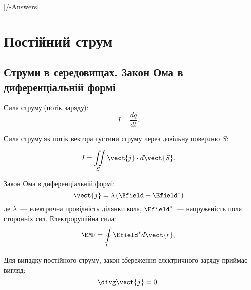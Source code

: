 
[\currfilebase/\currfilebase-Answers]
\chapter{Постійний струм}\label{\currfilebase}

\section{Струми в середовищах. Закон Ома в диференціальній формі}

\begin{Theory}



  Сила струму (потік заряду):
	\begin{equation} 
		I = \frac{dq}{dt}.
	\end{equation}
 
  Сила струму як потік вектора густини струму через довільну поверхню $S$:

  \begin{equation} 
	  I = \iint\limits_S\vect{j}\cdot d\vect{S}.
  \end{equation}



	Закон Ома в диференціальній формі:
  \begin{equation} 
	  \vect{j} = \lambda\left( \Efield + \Efield^*\right)
  \end{equation}
	\noindent де $\lambda$~--- електрична провідність ділянки кола,  $\Efield^*$~--- напруженість поля сторонніх сил. 
	Електрорушійна сила:
	\begin{equation} 
	\EMF = \oint\limits_L \Efield^* d\vect{r},
	\end{equation}

Для випадку постійного струму, закон збереження електричного заряду приймає вигляд:
  \begin{equation} 
	  \divg\vect{j} = 0.
  \end{equation}

\end{Theory}

